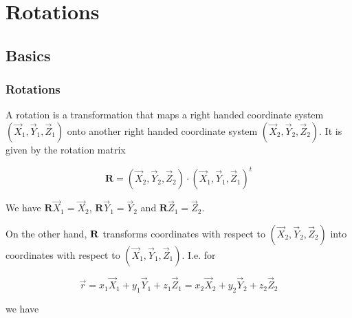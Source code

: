 \documentclass[compress]{beamer}
\begin{document}
\section{Rotations}

\subsection*{Basics}

\begin{frame}[fragile]
  \frametitle{Rotations}

  A rotation is a transformation that maps a right handed coordinate system
  $(\vec X_{1}, \vec Y_{1}, \vec Z_{1})$ onto another right handed coordinate
  system $(\vec X_{2}, \vec Y_{2}, \vec Z_{2})$. It is given by the rotation
  matrix

  \begin{equation*}
    \mathbf R = (\vec X_{2}, \vec Y_{2}, \vec Z_{2}) \cdot (\vec X_{1}, \vec Y_{1}, \vec Z_{1})^{t}
  \end{equation*}

  \medskip

  We have $\mathbf R \vec X_{1} = \vec X_{2}$, $\mathbf R \vec Y_{1} = \vec
  Y_{2}$ and $\mathbf R \vec Z_{1} = \vec Z_{2}$.

  \medskip
  \pause

  On the other hand, $\bf R$ transforms coordinates with respect to $(\vec
  X_{2}, \vec Y_{2}, \vec Z_{2})$ into coordinates with respect to $(\vec
  X_{1}, \vec Y_{1}, \vec Z_{1})$. I.e. for

  \begin{equation*}
    \vec r
    = x_{1} \vec X_{1} + y_{1} \vec Y_{1} + z_{1} \vec Z_{1}
    = x_{2} \vec X_{2} + y_{2} \vec Y_{2} + z_{2} \vec Z_{2}
  \end{equation*}

  we have


\end{frame}
\end{document}
